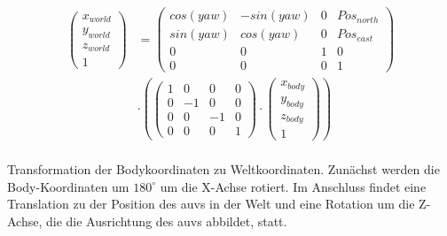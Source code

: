 \begin{ownequation}[H]
\begin{equation}
\begin{split}
\begin{pmatrix}
x_{world} \\ y_{world} \\ z_{world} \\ 1
\end{pmatrix}
& =
\begin{pmatrix}
cos(yaw) & -sin(yaw) & 0 & Pos_{north}\\
sin(yaw) & cos(yaw) & 0 & Pos_{east}\\
0 & 0 & 1 & 0\\
0 & 0 & 0 & 1
\end{pmatrix}\\
&\cdot
\left(
\begin{pmatrix}
1 & 0 & 0& 0\\
0 & -1 & 0& 0\\
0 & 0 & -1& 0\\
0 & 0 & 0 & 1
\end{pmatrix}
\cdot
\begin{pmatrix}
x_{body} \\ y_{body} \\ z_{body} \\ 1
\end{pmatrix}
\right)\\
\end{split}
\end{equation}
\caption[\gls{transform} der Bodykoordinaten zu Weltkoordinaten]{Transformation der Bodykoordinaten zu Weltkoordinaten. Zunächst werden die Body-Koordinaten um $180^\circ$ um die X-Achse rotiert. Im Anschluss findet eine Translation zu der Position des \gls{auv}s in der Welt und eine Rotation um die Z-Achse, die die Ausrichtung des \gls{auv}s abbildet, statt.}
\label{trans_body_world}
\end{ownequation}


